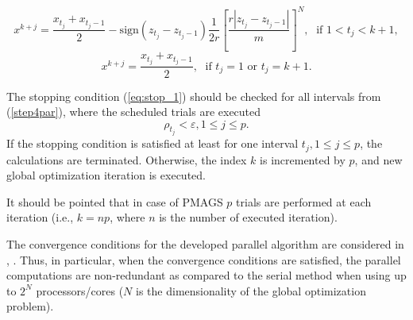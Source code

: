 \documentclass{aims}
\theoremstyle{definition}
\begin{document}
\begin{equation} \label{step5par}
x^{k+j}=\frac{x_{t_j}+x_{t_j-1}}{2}-\mathrm{sign}(z_{t_j}-z_{t_j-1})\frac{1}{2r}\left[\frac{r|z_{t_j}-z_{t_j-1}|}{m}\right]^N,\; \textrm{ if } 1<t_j<k+1,
\end{equation}
\[
x^{k+j}=\frac{x_{t_j}+x_{t_j-1}}{2},\; \textrm{ if } t_j=1 \textrm{ or } t_j=k+1.
\]
\par
The stopping condition (\ref{eq:stop_1}) should be checked for all intervals from (\ref{step4par}),
where the scheduled trials are executed
\begin{equation}
  \label{eq:stop}
\rho_{t_j}<\varepsilon,1\leq j\leq p.
\end{equation}
If the stopping condition is satisfied at least for one interval \(t_j, 1\le j\le p\), the calculations
are terminated. Otherwise, the index \(k\) is incremented by \(p\), and new global optimization iteration is executed.

It should be pointed that in case of PMAGS $p$ trials are performed at each iteration (i.e., $k=np$, where $n$ is the number of executed iteration).

The convergence conditions for the developed parallel algorithm are considered
in \cite{stronginGergelBarkalovParGO}, \cite{strSergGO}. Thus, in particular, when the convergence conditions are
satisfied, the parallel computations are non-redundant as compared to the serial method
when using up to \(2^N\) processors/cores (\(N\) is the dimensionality of the global optimization problem).
\end{document}
